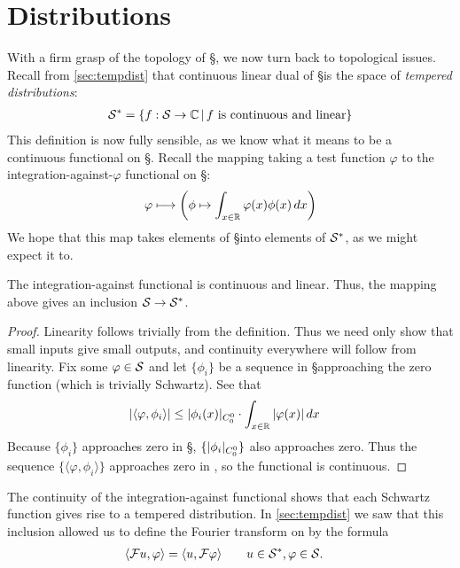
  \setcounter{chapter}{2}
  \setcounter{thm}{0}
  \chapter{Distributions}
  \label{ch:dist}
  
  With a firm grasp of the topology of \S, we now turn back to topological issues.
  Recall from \cref{sec:tempdist} that continuous linear dual of \S is the space of \emph{tempered distributions}:
  \begin{align*}
    \S^* = \{f:\S\rightarrow\C\,\vert\,f\text{ is continuous and linear}\}
  \end{align*}
  This definition is now fully sensible, as we know what it means to be a continuous functional on \S.
  Recall the mapping taking a test function $\varphi$ to the integration-against-$\varphi$ functional on \S:
  \begin{align*}
    \varphi \longmapsto \left( \phi \mapsto \int_{x\in\R} \varphi(x) \phi(x)\,dx \right)
  \end{align*}
  We hope that this map takes elements of \S into elements of $\S^*$, as we might expect it to.
  \begin{thm}
    The integration-against functional is continuous and linear.
    Thus, the mapping above gives an inclusion $\S\rightarrow\S^*$.
  \end{thm}
  \begin{proof}
    Linearity follows trivially from the definition.
    Thus we need only show that small inputs give small outputs, and continuity everywhere will follow from linearity.
    Fix some $\varphi\in\S$ and let $\{\phi_i\}$ be a sequence in \S approaching the zero function (which is trivially Schwartz).
    See that
    \begin{align*}
      |\langle\varphi,\phi_i\rangle| 
      &\le |\phi_i(x)|_\Coo \cdot \int_{x\in\R} |\varphi(x)|\,dx
    \end{align*}
    Because $\{\phi_i\}$ approaches zero in \S, $\{|\phi_i|_\Coo\}$ also approaches zero.
    Thus the sequence $\{\langle\varphi,\phi_i\rangle\}$ approaches zero in \C, so the functional is continuous.
  \end{proof}

  The continuity of the integration-against functional shows that each Schwartz function gives rise to a tempered distribution.
  In \cref{sec:tempdist} we saw that this inclusion allowed us to define the Fourier transform on \SS by the formula
  \begin{align*}
    \langle\F u, \varphi\rangle &= \langle u, \F\varphi\rangle
    \qquad u\in\SS, \varphi\in\S \text{.}
  \end{align*}
  
